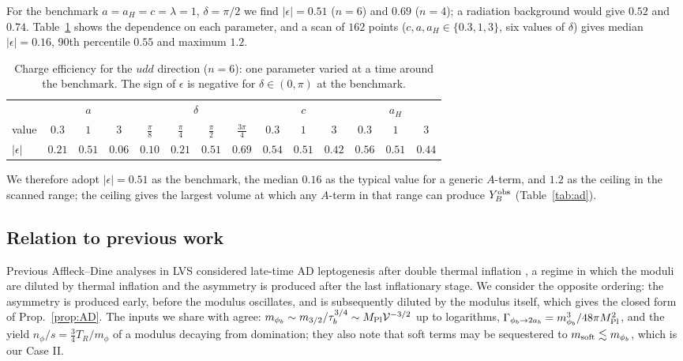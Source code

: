\documentclass[11pt]{article}
\newcommand{\MP}{M_{\rm Pl}}
\begin{document}
For the benchmark $a=a_H=c=\lambda=1$, $\delta=\pi/2$ we find $|\epsilon|=0.51$ ($n=6$) and $0.69$ ($n=4$); a radiation background would give $0.52$ and $0.74$. Table~\ref{tab:adsim} shows the dependence on each parameter, and a scan of $162$ points ($c,a,a_H\in\{0.3,1,3\}$, six values of $\delta$) gives median $|\epsilon|=0.16$, 90th percentile $0.55$ and maximum $1.2$.
\begin{table}[t]
\centering\small
\begin{tabular}{l|ccc|cccc|ccc|ccc}
\toprule
 & \multicolumn{3}{c|}{$a$} & \multicolumn{4}{c|}{$\delta$} & \multicolumn{3}{c|}{$c$} & \multicolumn{3}{c}{$a_H$}\\
value & $0.3$ & $1$ & $3$ & $\tfrac\pi8$ & $\tfrac\pi4$ & $\tfrac\pi2$ & $\tfrac{3\pi}4$ & $0.3$ & $1$ & $3$ & $0.3$ & $1$ & $3$\\
\midrule
$|\epsilon|$ & $0.21$ & $0.51$ & $0.06$ & $0.10$ & $0.21$ & $0.51$ & $0.69$ & $0.54$ & $0.51$ & $0.42$ & $0.56$ & $0.51$ & $0.44$\\
\bottomrule
\end{tabular}
\caption{Charge efficiency for the $udd$ direction ($n=6$): one parameter varied at a time around the benchmark. The sign of $\epsilon$ is negative for $\delta\in(0,\pi)$ at the benchmark.}\label{tab:adsim}
\end{table}
We therefore adopt $|\epsilon|=0.51$ as the benchmark, the median $0.16$ as the typical value for a generic $A$-term, and $1.2$ as the ceiling in the scanned range; the ceiling gives the largest volume at which any $A$-term in that range can produce $Y_B^{\rm obs}$ (Table~\ref{tab:ad}).

\subsection{Relation to previous work}
Previous Affleck--Dine analyses in LVS considered late-time AD leptogenesis after double thermal inflation \cite{Choi:2012}, a regime in which the moduli are diluted by thermal inflation and the asymmetry is produced after the last inflationary stage. We consider the opposite ordering: the asymmetry is produced early, before the modulus oscillates, and is subsequently diluted by the modulus itself, which gives the closed form of Prop.~\ref{prop:AD}. The inputs we share with \cite{Choi:2012} agree: $m_{\phi_b}\sim m_{3/2}/\tau_b^{3/4}\sim\MP\mathcal V^{-3/2}$ up to logarithms, $\Gamma_{\phi_b\to2a_b}=m_{\phi_b}^3/48\pi\MP^2$, and the yield $n_\phi/s=\tfrac34T_R/m_\phi$ of a modulus decaying from domination; they also note that soft terms may be sequestered to $m_{\rm soft}\lesssim m_{\phi_b}$, which is our Case II.
\end{document}
